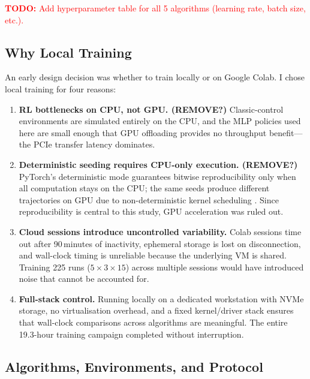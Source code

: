 \textcolor{red}{\textbf{TODO:} Add hyperparameter table for all 5 algorithms (learning rate, batch size, etc.).}

\subsection{Why Local Training}
\label{sec:why-local}

An early design decision was whether to train locally or on Google
Colab. I chose local training for four reasons:

\begin{enumerate}
  \item \textbf{RL bottlenecks on CPU, not GPU. (REMOVE?)}
        Classic-control environments are simulated entirely on the CPU,
        and the MLP policies used here are small enough that GPU
        offloading provides no throughput benefit---the PCIe transfer
        latency dominates.

  \item \textbf{Deterministic seeding requires CPU-only execution. (REMOVE?)}
        PyTorch's deterministic mode guarantees bitwise reproducibility
        only when all computation stays on the CPU; the same seeds
        produce different trajectories on GPU due to non-deterministic
        kernel scheduling \citep{pytorch_reproducibility}.
        Since reproducibility is central to this study, GPU acceleration
        was ruled out.

  \item \textbf{Cloud sessions introduce uncontrolled variability.}
        Colab sessions time out after 90\,minutes of inactivity,
        ephemeral storage is lost on disconnection, and wall-clock
        timing is unreliable because the underlying VM is shared.
        Training 225 runs ($5 \times 3 \times 15$) across multiple
        sessions would have introduced noise that cannot be accounted
        for.

  \item \textbf{Full-stack control.}
        Running locally on a dedicated workstation with NVMe storage,
        no virtualisation overhead, and a fixed kernel/driver stack
        ensures that wall-clock comparisons across algorithms are
        meaningful. The entire 19.3-hour training campaign completed
        without interruption.
\end{enumerate}

\subsection{Algorithms, Environments, and Protocol}
\label{sec:algo-env-protocol}


